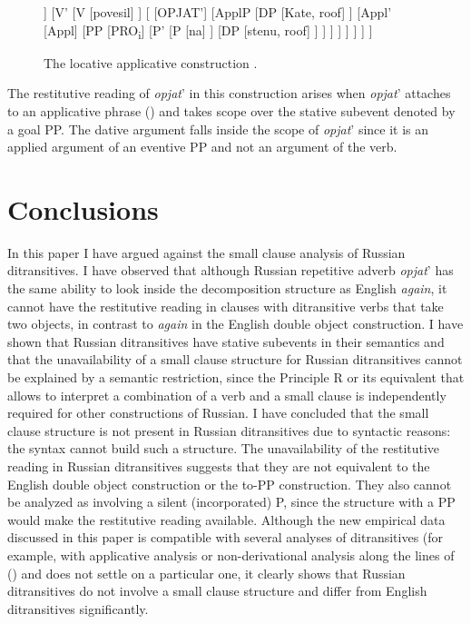 \documentclass[output=paper,modfonts,nonflat,
 hidelinks
]{langsci/langscibook}
\begin{document}
\begin{figure}
\begin{forest}%
[VP
  [DP
    [{kartinu\textsubscript{i}}, roof]
  ]
  [V'
    [V
      [povesil]
    ]
    [
      [OPJAT']
      [ApplP
	[DP
	  [Kate, roof]
	]
	[Appl'
	  [Appl]
	  [PP
	    [PRO\textsubscript{i}]
	    [P'
	      [P
		[na]	  
	      ]
	      [DP
		[stenu, roof]
	      ]
	    ]
	  ]
	]
      ]
    ]
  ]
]
\end{forest}
\caption{The locative applicative construction .}
\label{fig:bondarenko:4}
\end{figure}


The restitutive reading of \textit{opjat}’ in this construction arises when \textit{opjat}’ attaches to an applicative phrase () and takes scope over the stative subevent denoted by a goal PP. The dative argument falls inside the scope of \textit{opjat}’ since it is an applied argument of an eventive PP and not an argument of the verb.


\section{Conclusions}

In this paper I have argued against the small clause analysis of Russian ditransitives. I have observed that although Russian repetitive adverb \textit{opjat}’ has the same ability to look inside the decomposition structure as English \textit{again}, it cannot have the restitutive reading in clauses with ditransitive verbs that take two objects, in contrast to \textit{again} in the English double object construction. I have shown that Russian ditransitives have stative subevents in their semantics and that the unavailability of a small clause structure for Russian ditransitives cannot be explained by a semantic restriction, since the Principle R or its equivalent that allows to interpret a combination of a verb and a small clause is independently required for other constructions of Russian. I have concluded that the small clause structure is not present in Russian ditransitives due to syntactic reasons: the syntax cannot build such a structure. The unavailability of the restitutive reading in Russian ditransitives suggests that they are not equivalent to the English double object construction or the to-PP construction. They also cannot be analyzed as involving a silent (incorporated) P, since the structure with a PP would make the restitutive reading available. Although the new empirical data discussed in this paper is compatible with several analyses of ditransitives (for example, with applicative analysis \citep{Bruening2010} or non-derivational analysis along the lines of (\citealt{BonehNash2017}) and does not settle on a particular one, it clearly shows that Russian ditransitives do not involve a small clause structure and differ from English ditransitives significantly.
\end{document}
